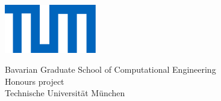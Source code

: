 


\def\bcorcor{0.15cm}
\addtolength{\hoffset}{\bcorcor}

\thispagestyle{empty}

 \vspace{10mm}
\begin{center}
	       \includegraphics[width=4cm]{styles/tum_logo.png}
	   
	   \vspace{5mm}     
	   \huge Bavarian Graduate School of Computational Engineering \\Honours project\\ 
	   \vspace{0.5cm}
	 \large Technische Universit{\"a}t M{\"u}nchen\\
        
	\end{center}
		

